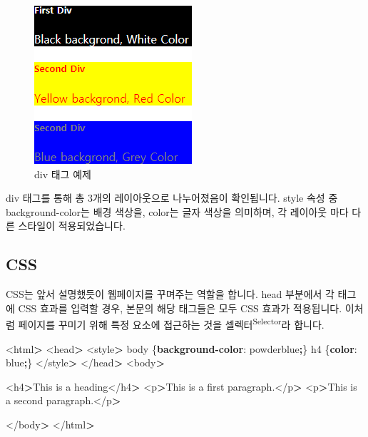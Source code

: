 \documentclass[12pt,]{book}
\newenvironment{Shaded}{\begin{snugshade}}{\end{snugshade}}
\newcommand{\ConstantTok}[1]{\textcolor[rgb]{0.00,0.00,0.00}{#1}}
\newcommand{\FunctionTok}[1]{\textcolor[rgb]{0.00,0.00,0.00}{#1}}
\newcommand{\KeywordTok}[1]{\textcolor[rgb]{0.13,0.29,0.53}{\textbf{#1}}}
\newcommand{\NormalTok}[1]{#1}
\newcommand{\OperatorTok}[1]{\textcolor[rgb]{0.81,0.36,0.00}{\textbf{#1}}}
\begin{document}
\begin{figure}[h]

{\centering \includegraphics[width=0.7\linewidth]{images/html_7} 

}

\caption{div 태그 예제}\label{fig:unnamed-chunk-18}
\end{figure}

div 태그를 통해 총 3개의 레이아웃으로 나누어졌음이 확인됩니다. style 속성 중 background-color는 배경 색상을, color는 글자 색상을 의미하며, 각 레이아웃 마다 다른 스타일이 적용되었습니다.

\hypertarget{css}{%
\subsection{CSS}\label{css}}

CSS는 앞서 설명했듯이 웹페이지를 꾸며주는 역할을 합니다. head 부분에서 각 태그에 CSS 효과를 입력할 경우, 본문의 해당 태그들은 모두 CSS 효과가 적용됩니다. 이처럼 페이지를 꾸미기 위해 특정 요소에 접근하는 것을 셀렉터\textsuperscript{Selector}라 합니다.

\begin{Shaded}
\begin{Highlighting}[]
\NormalTok{<html}\OperatorTok{>}
\NormalTok{<head}\OperatorTok{>}
\NormalTok{<style}\OperatorTok{>}
\NormalTok{body \{}\KeywordTok{background-color}\NormalTok{: }\ConstantTok{powderblue}\OperatorTok{;}\NormalTok{\}}
\NormalTok{h4   \{}\KeywordTok{color}\NormalTok{: }\ConstantTok{blue}\OperatorTok{;}\NormalTok{\}}
\NormalTok{</style}\OperatorTok{>}
\NormalTok{</head}\OperatorTok{>}
\NormalTok{<body}\OperatorTok{>}

\NormalTok{<h4}\OperatorTok{>}\NormalTok{This is a heading</h4}\OperatorTok{>}
\NormalTok{<p}\OperatorTok{>}\NormalTok{This is a first paragraph}\FunctionTok{.}\NormalTok{</p}\OperatorTok{>}
\NormalTok{<p}\OperatorTok{>}\NormalTok{This is a second paragraph}\FunctionTok{.}\NormalTok{</p}\OperatorTok{>}

\NormalTok{</body}\OperatorTok{>}
\NormalTok{</html}\OperatorTok{>}
\end{Highlighting}
\end{Shaded}
\end{document}
